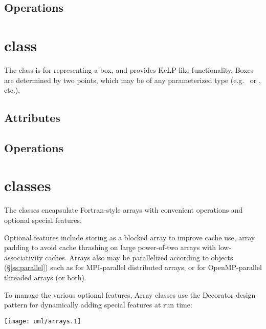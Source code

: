 \subsection{Operations}

\section{ class}

The  class is for representing a box, and provides KeLP-like functionality.
Boxes are determined by two points, which may be of any parameterized type
(e.g.~ or , etc.).


\subsection{Attributes}

\subsection{Operations}

\section{ classes}

The  classes encapsulate Fortran-style arrays with
convenient operations and optional special features.  

Optional features include storing as a blocked array to improve cache
use, array padding to avoid cache thrashing on large power-of-two
arrays with low-associativity caches.  Arrays also may be parallelized
according to  objects (\S\ref{ss:parallel}) such as
 for MPI-parallel distributed arrays, or
 for OpenMP-parallel threaded arrays (or both).

To manage the various optional features, Array classes use the
Decorator design pattern for dynamically adding special features at
run time:

 \centerline{\texttt{[image: uml/arrays.1]}}

\subsection{}

